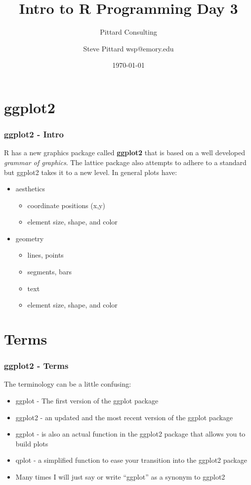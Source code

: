 \documentclass{beamer}
\begin{document}


\title{Intro to R Programming Day 3}
\author{Steve Pittard wsp@emory.edu}
\subtitle{Pittard Consulting}
\date{\today}

\maketitle


\section{ggplot2}


\begin{frame}[fragile]
\frametitle{ggplot2 - Intro}
R has a new graphics package called \textbf{ggplot2} that is based on a well developed
\textit{grammar of graphics}. The lattice package also attempts to adhere to a standard but
ggplot2 takes it to a new level. In general plots have:

\begin{itemize}

\item aesthetics
\begin{itemize}
\item coordinate positions (x,y)
\item element size, shape, and color
\end{itemize}

\item geometry 
\begin{itemize}
\item lines, points
\item segments, bars
\item text
\item element size, shape, and color
\end{itemize}

\end{itemize}
\end{frame}

\section{Terms}
\begin{frame}[fragile]
\frametitle{ggplot2 - Terms}
The terminology can be a little confusing:

\begin{itemize}
\item ggplot - The first version of the ggplot package
\item ggplot2 - an updated and the most recent version of the ggplot package
\item ggplot - is also an actual function in the ggplot2 package that allows you to build plots
\item qplot - a simplified function to ease your transition into the ggplot2 package
\item Many times I will just say or write ``ggplot'' as a synonym to ggplot2

\end{itemize}
\end{frame}
\end{document}
